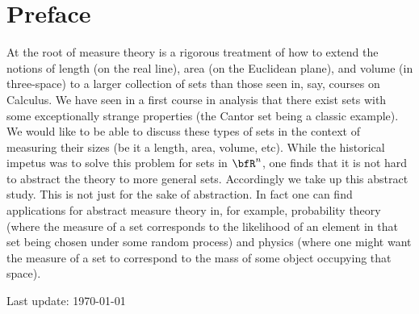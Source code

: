\documentclass[10pt,twoside,openany]{memoir}
\begin{document}
    \chapter*{Preface}
    At the root of measure theory is a rigorous treatment of how to extend the notions of length (on the real line), area (on the Euclidean plane), and volume (in three-space) to a larger collection of sets than those seen in, say, courses on Calculus. We have seen in a first course in analysis that there exist sets with some exceptionally strange properties (the Cantor set being a classic example). We would like to be able to discuss these types of sets in the context of measuring their sizes (be it a length, area, volume, etc). While the historical impetus was to solve this problem for sets in $\bfR^n$, one finds that it is not hard to abstract the theory to more general sets. Accordingly we take up this abstract study. This is not just for the sake of abstraction. In fact one can find applications for abstract measure theory in, for example, probability theory (where the measure of a set corresponds to the likelihood of an element in that set being chosen under some random process) and physics (where one might want the measure of a set to correspond to the mass of some object occupying that space).

    \vfill
    \specialdate
    Last update: \today

    \newpage
    \tableofcontents

    
\end{document}
